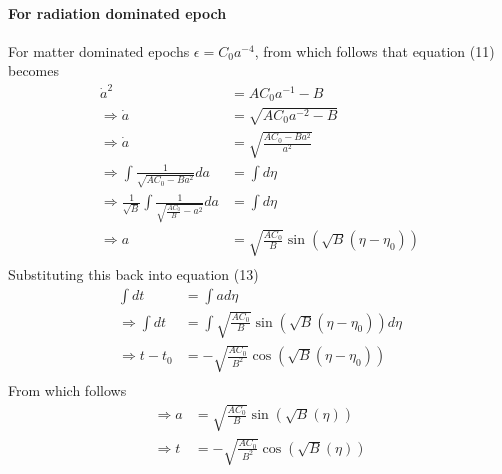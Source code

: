 \documentclass[a4paper, 11pt]{FSKH_623_Report}
\numberwithin{equation}{section}
\newcommand{\brac}[1]{\left(#1\right)}
\begin{document}
\paragraph*{For radiation dominated epoch}
For matter dominated epochs $\epsilon=C_{0}a^{-4}$, from which follows that equation (11) becomes
\begin{equation}
\begin{split}
\dot{a}^{2} &= AC_{0} a^{-1}-B\\
\Rightarrow \dot{a} &= \sqrt{AC_{0} a^{-2}-B}\\
\Rightarrow \dot{a} &= \sqrt{\frac{{AC_{0}-Ba^{2}}}{a^{2}}}\\
\Rightarrow \int \frac{1}{\sqrt{{AC_{0}-Ba^{2}}}}da &= \int d\eta\\
\Rightarrow \frac{1}{\sqrt{B}}\int \frac{1}{\sqrt{{\frac{AC_{0}}{B}-a^{2}}}}da &= \int d\eta\\
\Rightarrow a &= \sqrt{\frac{AC_{0}}{B}}\sin\brac{\sqrt{B}\brac{\eta-\eta_{0}}}\\
\end{split}
\end{equation}
Substituting this back into equation (13)
\begin{equation}
\begin{split}
\int dt &= \int ad\eta\\
\Rightarrow \int dt &= \int \sqrt{\frac{AC_{0}}{B}}\sin\brac{\sqrt{B}\brac{\eta-\eta_{0}}} d\eta\\
\Rightarrow t-t_{0} &= -\sqrt{\frac{AC_{0}}{B^{2}}}\cos\brac{\sqrt{B}\brac{\eta-\eta_{0}}} \\
\end{split}
\end{equation}
From which follows
\begin{equation}
\begin{split}
\Rightarrow  a &= \sqrt{\frac{AC_{0}}{B}}\sin\brac{\sqrt{B}\brac{\eta}}\\
\Rightarrow t &= -\sqrt{\frac{AC_{0}}{B^{2}}}\cos\brac{\sqrt{B}\brac{\eta}} \\
\end{split}
\end{equation}
\end{document}
